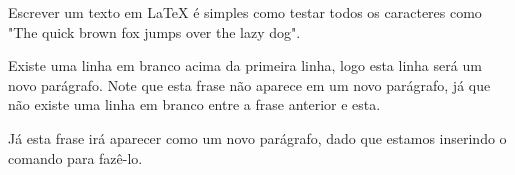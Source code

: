 \documentclass{article}
\begin{document}
	Escrever um texto em LaTeX é simples como testar todos os caracteres como "The quick brown fox jumps over the lazy dog".

	Existe uma linha em branco acima da primeira linha, logo esta linha será um novo parágrafo.
	Note que esta frase não aparece em um novo parágrafo, já que não existe uma linha em branco entre a frase anterior e esta. \par Já esta frase irá aparecer como um novo parágrafo, dado que estamos inserindo o comando para fazê-lo.
\end{document}
